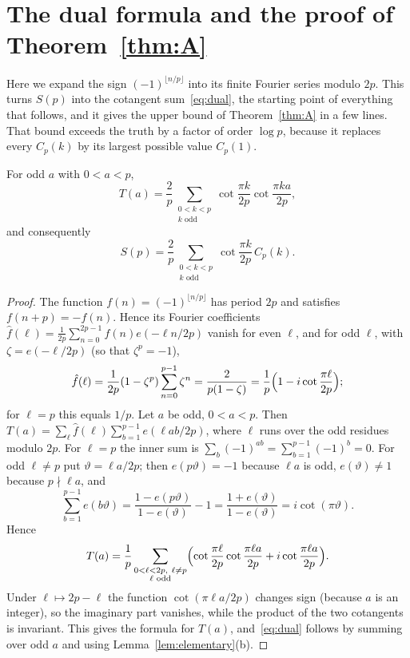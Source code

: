 \section{The dual formula and the proof of Theorem~\ref{thm:A}}\label{sec:dual}

Here we expand the sign $(-1)^{\lfloor n/p\rfloor}$ into its finite Fourier series modulo $2p$. This turns $S(p)$ into the cotangent sum~\eqref{eq:dual}, the starting point of everything that follows, and it gives the upper bound of Theorem~\ref{thm:A} in a few lines. That bound exceeds the truth by a factor of order $\log p$, because it replaces every $C_p(k)$ by its largest possible value $C_p(1)$.

\begin{lemma}\label{lem:dual}
For odd $a$ with $0<a<p$,
\[
T(a)=\frac2p\sum_{\substack{0<k<p\\ k\text{ odd}}}\cot\frac{\pi k}{2p}\cot\frac{\pi ka}{2p},
\]
and consequently
\begin{equation}\label{eq:dual}
S(p)=\frac2p\sum_{\substack{0<k<p\\ k\text{ odd}}}\cot\frac{\pi k}{2p}\,C_p(k).
\end{equation}
\end{lemma}

\begin{proof}
The function $f(n)=(-1)^{\lfloor n/p\rfloor}$ has period $2p$ and satisfies $f(n+p)=-f(n)$. Hence its Fourier coefficients $\hat f(\ell)=\frac1{2p}\sum_{n=0}^{2p-1}f(n)e(-\ell n/2p)$ vanish for even $\ell$, and for odd $\ell$, with $\zeta=e(-\ell/2p)$ (so that $\zeta^p=-1$),
\begin{equation}\label{eq:fourier-coeff}
\hat f(\ell)=\frac1{2p}(1-\zeta^p)\sum_{n=0}^{p-1}\zeta^n=\frac2{p(1-\zeta)}=\frac1p\Bigl(1-i\cot\frac{\pi\ell}{2p}\Bigr);
\end{equation}
for $\ell=p$ this equals $1/p$. Let $a$ be odd, $0<a<p$. Then $T(a)=\sum_\ell\hat f(\ell)\sum_{b=1}^{p-1}e(\ell ab/2p)$, where $\ell$ runs over the odd residues modulo $2p$. For $\ell=p$ the inner sum is $\sum_b(-1)^{ab}=\sum_{b=1}^{p-1}(-1)^b=0$. For odd $\ell\ne p$ put $\vartheta=\ell a/2p$; then $e(p\vartheta)=-1$ because $\ell a$ is odd, $e(\vartheta)\ne1$ because $p\nmid\ell a$, and
\[
\sum_{b=1}^{p-1}e(b\vartheta)=\frac{1-e(p\vartheta)}{1-e(\vartheta)}-1=\frac{1+e(\vartheta)}{1-e(\vartheta)}=i\cot(\pi\vartheta).
\]
Hence
\[
T(a)=\frac1p\sum_{\substack{0<\ell<2p,\ \ell\ne p\\ \ell\text{ odd}}}\Bigl(\cot\frac{\pi\ell}{2p}\cot\frac{\pi\ell a}{2p}+i\cot\frac{\pi\ell a}{2p}\Bigr).
\]
Under $\ell\mapsto2p{-}\ell$ the function $\cot(\pi\ell a/2p)$ changes sign (because $a$ is an integer), so the imaginary part vanishes, while the product of the two cotangents is invariant. This gives the formula for $T(a)$, and~\eqref{eq:dual} follows by summing over odd $a$ and using Lemma~\ref{lem:elementary}(b).
\end{proof}

